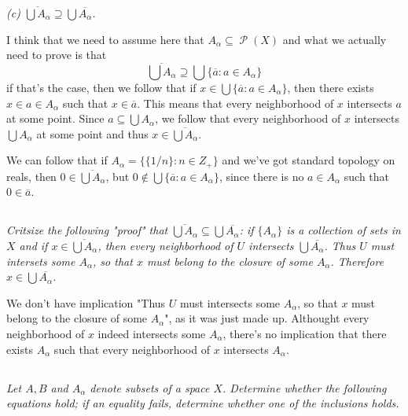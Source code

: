 \documentclass[11pt,oneside,titlepage]{book}
\DeclareMathOperator \pow {\mathcal {P}}
\newcommand{\set}[1]{\{ #1 \}}
\begin{document}
\textit{(c) $\overline{\bigcup A_\alpha} \supseteq \bigcup \overline{A_\alpha}$. }

I think that we need to assume here that $A_\alpha \subseteq \pow(X)$
and what we actually need to prove is that
$$\overline{\bigcup A_\alpha} \supseteq \bigcup \set{\overline{a}: a \in A_\alpha}$$
if that's the case, then we follow that if $x \in \bigcup \set{\overline{a}: a \in A_\alpha}$,
then there exists $x \in a \in A_\alpha$ such that $x \in \overline{a}$.
This means that every neighborhood of $x$ intersects $a$ at some point.
Since $a \subseteq \bigcup A_\alpha$, we follow that every neighborhood of
$x$ intersects $\bigcup A_\alpha$ at some point and thus
$x \in \overline{\bigcup A_\alpha}$.

We can follow that if $A_\alpha = \set{\set{1/n}: n \in Z_+}$ and we've got
standard topology on reals, then $0 \in \overline{\bigcup{A_\alpha}}$,
but $0 \notin \bigcup \set{\overline{a}: a \in A_\alpha}$, since there is
no $a \in A_\alpha$ such that $0 \in \overline{a}$.

\subsection{}

\textit{Critsize the following "proof" that
  $\overline{\bigcup A_\alpha} \subseteq \bigcup \overline{A_\alpha}$:
  if $\set{A_\alpha}$ is a collection of sets in $X$ and if
  $x \in \overline{\bigcup A_\alpha}$,
  then every neighborhood of $U$ intersects $\bigcup \overline{A_\alpha}$.
  Thus $U$ must intersets some $A_\alpha$, so that $x$ must belong to the
  closure of some $A_\alpha$. Therefore $x \in \bigcup{\overline{A_\alpha}}$.}

We don't have implication "Thus $U$ must intersects some $A_\alpha$, so that $x$ must belong to the
closure of some $A_\alpha$", as it was just made up. Althought every neighborhood of $x$
indeed intersects some $A_\alpha$, there's no implication that there exists $A_\alpha$
such that every neighborhood of $x$ intersects $A_\alpha$.

\subsection{}

\textit{Let $A, B$ and $A_\alpha$ denote subsets of a space $X$. Determine whether the
  following equations hold; if an equality fails, determine whether one of the
  inclusions holds.}
\end{document}
